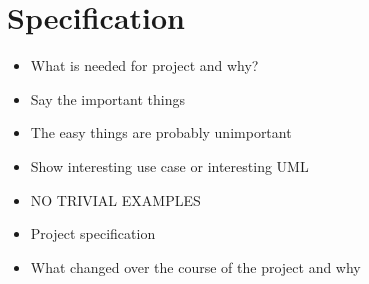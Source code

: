\chapter{Specification}
\label{chap:specification}


\begin{itemize}
\item What is needed for project and why?
\item Say the important things
\item The easy things are probably unimportant
\item Show interesting use case or interesting UML
\item NO TRIVIAL EXAMPLES
\item Project specification
\item What changed over the course of the project and why
\end{itemize}


